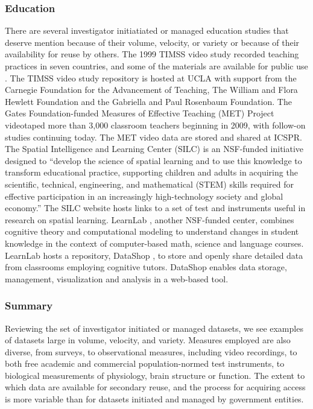 \documentclass[letterpaper,man,apacite]{apa6}
\begin{document}
\subsubsection{Education}

There are several investigator initiatiated or managed education studies that deserve mention because of their volume, velocity, or variety or because of their availability for reuse by others.
The 1999 TIMSS video study recorded teaching practices in seven countries, and some of the materials are available for public use \cite{TIMSS_video}.
The TIMSS video study repository is hosted at UCLA with support from the Carnegie Foundation for the Advancement of Teaching, The William and Flora Hewlett Foundation and the Gabriella and Paul Rosenbaum Foundation.
The Gates Foundation-funded Measures of Effective Teaching (MET) \cite{METProject} Project videotaped more than 3,000 classroom teachers beginning in 2009, with follow-on studies continuing today.
The MET video data are stored and shared at ICSPR.
The Spatial Intelligence and Learning Center (SILC) \cite{SILC} is an NSF-funded initiative designed to ``develop the science of spatial learning and to use this knowledge to transform educational practice, supporting children and adults in acquiring the scientific, technical, engineering, and mathematical (STEM) skills required for effective participation in an increasingly high-technology society and global economy.''
The SILC website hosts links to a set of test and instruments useful in research on spatial learning.
LearnLab \cite{LearnLab}, another NSF-funded center, combines cognitive theory and computational modeling to understand changes in student knowledge in the context of computer-based math, science and language courses. 
LearnLab hosts a repository, DataShop \cite{DataShop}, to store and openly share detailed data from classrooms employing cognitive tutors.
DataShop enables data storage, management, visualization and analysis in a web-based tool.

\subsubsection{Summary}

Reviewing the set of investigator initiated or managed datasets, we see examples of datasets large in volume, velocity, and variety.
Measures employed are also diverse, from surveys, to observational measures, including video recordings, to both free academic and commercial population-normed test instruments, to biological measurements of physiology, brain structure or function.
The extent to which data are available for secondary reuse, and the process for acquiring access is more variable than for datasets initiated and managed by government entities.
\end{document}
